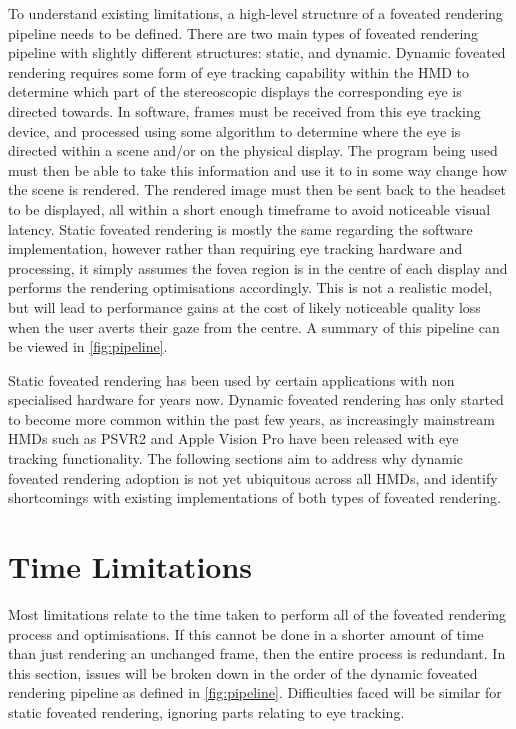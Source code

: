 \documentclass[a4paper,11pt]{article}
\begin{document}
To understand existing limitations, a high-level structure of a foveated rendering pipeline needs to be defined. There are two main types of foveated rendering pipeline with slightly different structures: static, and dynamic. Dynamic foveated rendering requires some form of eye tracking capability within the HMD to determine which part of the stereoscopic displays the corresponding eye is directed towards. In software, frames must be received from this eye tracking device, and processed using some algorithm to determine where the eye is directed within a scene and/or on the physical display. The program being used must then be able to take this information and use it to in some way change how the scene is rendered. The rendered image must then be sent back to the headset to be displayed, all within a short enough timeframe to avoid noticeable visual latency. Static foveated rendering is mostly the same regarding the software implementation, however rather than requiring eye tracking hardware and processing, it simply assumes the fovea region is in the centre of each display and performs the rendering optimisations accordingly. This is not a realistic model, but will lead to performance gains at the cost of likely noticeable quality loss when the user averts their gaze from the centre. A summary of this pipeline can be viewed in \cref{fig:pipeline}.

Static foveated rendering has been used by certain applications with non specialised hardware for years now. Dynamic foveated rendering has only started to become more common within the past few years, as increasingly mainstream HMDs such as PSVR2\cite{} and Apple Vision Pro\cite{} have been released with eye tracking functionality. The following sections aim to address why dynamic foveated rendering adoption is not yet ubiquitous across all HMDs, and identify shortcomings with existing implementations of both types of foveated rendering.

\section{Time Limitations}
Most limitations relate to the time taken to perform all of the foveated rendering process and optimisations. If this cannot be done in a shorter amount of time than just rendering an unchanged frame, then the entire process is redundant. In this section, issues will be broken down in the order of the dynamic foveated rendering pipeline as defined in \cref{fig:pipeline}. Difficulties faced will be similar for static foveated rendering, ignoring parts relating to eye tracking.
\end{document}
